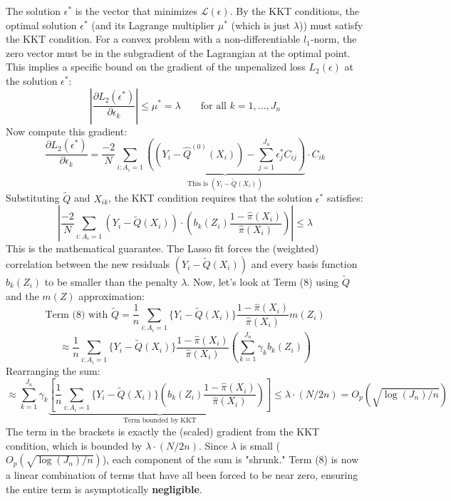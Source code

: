 \documentclass{article} %
\theoremstyle{plain} %
\theoremstyle{definition} %
\theoremstyle{remark} %
\begin{document}
The solution $\epsilon^*$ is the vector that minimizes $\mathcal{L}(\epsilon)$. By the KKT conditions, the optimal solution $\epsilon^*$ (and its Lagrange multiplier $\mu^*$ (which is just $\lambda$)) must satisfy the KKT condition.
\newline
\newline
For a convex problem with a non-differentiable $l_1$-norm, the zero vector must be in the subgradient of the Lagrangian at the optimal point. This implies a specific bound on the gradient of the unpenalized loss $L_2(\epsilon)$ at the solution $\epsilon^*$:
$$
\left| \frac{\partial L_2(\epsilon^*)}{\partial \epsilon_k} \right| \le \mu^*=\lambda \quad  \quad \text{for all } k = 1, \dots, J_n
$$
Now compute this gradient:
$$
\frac{\partial L_2(\epsilon^*)}{\partial \epsilon_k} = \frac{-2}{N} \sum_{i: A_i=1} \underbrace{\left( (Y_i - \hat{Q}^{(0)}(X_i)) - \sum_{j=1}^{J_n} \epsilon_j^* C_{ij} \right)}_{\text{This is } (Y_i - \widetilde{Q}(X_i))} \cdot C_{ik}
$$
Substituting $\widetilde{Q}$ and $X_{ik}$, the KKT condition requires that the solution $\epsilon^*$ satisfies:
$$
\left| \frac{-2}{N} \sum_{i: A_i=1} \left( Y_i - \widetilde{Q}(X_i) \right) \cdot \left( b_k(Z_i) \frac{1-\hat{\pi}(X_i)}{\hat{\pi}(X_i)} \right) \right| \le \lambda
$$
This is the mathematical guarantee. The Lasso fit forces the (weighted) correlation between the new residuals $(Y_i - \widetilde{Q}(X_i))$ and every basis function $b_k(Z_i)$ to be smaller than the penalty $\lambda$.
\newline
Now, let's look at Term (8) using $\widetilde{Q}$ and the $m(Z)$ approximation:
$$
\text{Term (8) with } \widetilde{Q} = \frac{1}{n}\sum_{i: A_i=1} \{Y_{i}-\widetilde{Q}(X_{i})\} \frac{1-\hat{\pi}(X_{i})}{\hat{\pi}(X_{i})} m(Z_{i})
$$
$$
\approx \frac{1}{n}\sum_{i: A_i=1} \{Y_{i}-\widetilde{Q}(X_{i})\} \frac{1-\hat{\pi}(X_{i})}{\hat{\pi}(X_{i})} \left( \sum_{k=1}^{J_n} \gamma_k b_k(Z_i) \right)
$$
Rearranging the sum:
$$
\approx \sum_{k=1}^{J_n} \gamma_k \underbrace{ \left[ \frac{1}{n} \sum_{i: A_i=1} \{Y_{i}-\widetilde{Q}(X_{i})\} \left( b_k(Z_i) \frac{1-\hat{\pi}(X_i)}{\hat{\pi}(X_i)} \right) \right] }_{\text{Term bounded by KKT}} \leq \lambda \cdot (N/2n) = O_p(\sqrt{\log(J_n)/n})
$$
The term in the brackets is exactly the (scaled) gradient from the KKT condition, which is bounded by $\lambda \cdot (N/2n)$. Since $\lambda$ is small ($O_p(\sqrt{\log(J_n)/n})$), each component of the sum is "shrunk." Term (8) is now a linear combination of terms that have all been forced to be near zero, ensuring the entire term is asymptotically \textbf{negligible}.
\end{document}
